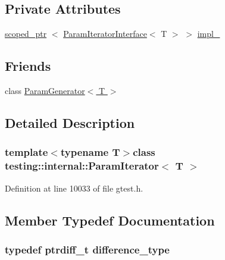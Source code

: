 \subsection*{\-Private \-Attributes}
\begin{DoxyCompactItemize}
\item 
\hyperlink{classtesting_1_1internal_1_1scoped__ptr}{scoped\-\_\-ptr}\*
$<$ \hyperlink{classtesting_1_1internal_1_1ParamIteratorInterface}{\-Param\-Iterator\-Interface}$<$ \-T $>$ $>$ \hyperlink{classtesting_1_1internal_1_1ParamIterator_a865458fe18233eb7504aa2d66ba5f764}{impl\-\_\-}
\end{DoxyCompactItemize}
\subsection*{\-Friends}
\begin{DoxyCompactItemize}
\item 
class \hyperlink{classtesting_1_1internal_1_1ParamIterator_ab73a355ae191f2f7eab54b65ca557714}{\-Param\-Generator$<$ T $>$}
\end{DoxyCompactItemize}


\subsection{\-Detailed \-Description}
\subsubsection*{template$<$typename T$>$class testing\-::internal\-::\-Param\-Iterator$<$ T $>$}



\-Definition at line 10033 of file gtest.\-h.



\subsection{\-Member \-Typedef \-Documentation}
\hypertarget{classtesting_1_1internal_1_1ParamIterator_acf947bbb9e09f863cc3572ff8550b183}{
\subsubsection[{difference\-\_\-type}]{\setlength{\rightskip}{0pt plus 5cm}typedef ptrdiff\-\_\-t {\bf difference\-\_\-type}}}\label{d0/ddb/classtesting_1_1internal_1_1ParamIterator_acf947bbb9e09f863cc3572ff8550b183}


